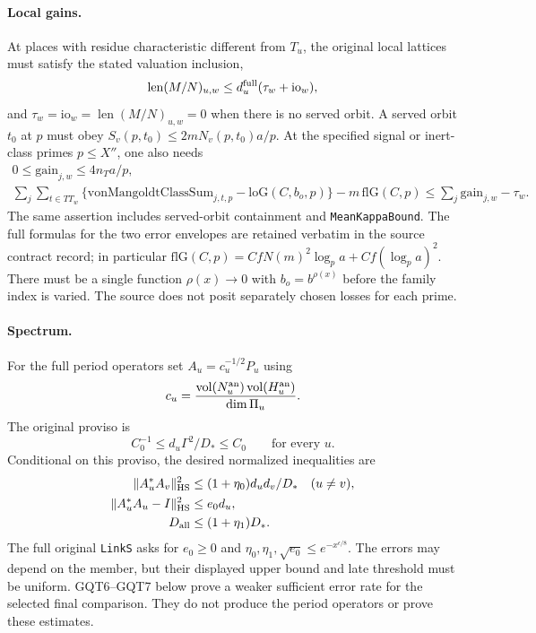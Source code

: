 \paragraph{Local gains.}
At places with residue characteristic different from $T_u$, the
original local lattices must satisfy the stated valuation inclusion,
\[
 \operatorname{len}(M/N)_{u,w}\le d_u^{\rm full}
                                      (\tau_w+\mathrm{io}_w),
\]
and $\tau_w=\mathrm{io}_w=\operatorname{len}(M/N)_{u,w}=0$
when there is no served orbit. A served orbit $t_0$ at $p$ must obey
$S_v(p,t_0)\le2mN_v(p,t_0)a/p$. At the specified signal or
inert-class primes $p\le X''$, one also needs
\begin{gather}
       0\le\mathrm{gain}_{j,w}\le4n_Ta/p,                 \label{eq:gqt-gain1}\\
 \sum_j\sum_{t\in TT_w}
  \{\mathrm{vonMangoldtClassSum}_{j,t,p}-\mathrm{loG}(C,b_o,p)\}
       -m\,\mathrm{flG}(C,p)
   \le\sum_j\mathrm{gain}_{j,w}-\tau_w.                 \label{eq:gqt-gain2}
\end{gather}
The same assertion includes served-orbit containment and
\texttt{MeanKappaBound}. The full formulas for the two error
envelopes are retained verbatim in the source contract record;
in particular $\mathrm{flG}(C,p)=CfN(m)^2\log_p a+
Cf(\log_p a)^2$. There must be a single function $\rho(x)\to0$
with $b_o=b^{\rho(x)}$ before the family index is varied.
The source does not posit separately chosen losses for each prime.

\paragraph{Spectrum.}
For the full period operators set $A_u=c_u^{-1/2}P_u$ using
\[
 c_u=\frac{\operatorname{vol}(N_u^{\rm an})
                 \operatorname{vol}(H_u^{\rm an})}{\dim\Pi_u}.
\]
The original proviso is
\begin{equation}\label{eq:gqt-proviso}
 C_0^{-1}\le d_u\Gamma^2/D_*\le C_0\qquad\text{for every }u.
\end{equation}
Conditional on this proviso, the desired normalized inequalities are
\begin{align}
 \|A_u^*A_v\|_{\mathrm{HS}}^2
     &\le(1+\eta_0)d_ud_v/D_*\quad(u\ne v),             \label{eq:gqt-off}\\
 \|A_u^*A_u-I\|_{\mathrm{HS}}^2&\le e_0d_u,            \label{eq:gqt-diag}\\
 D_{\rm all}&\le(1+\eta_1)D_*.                         \label{eq:gqt-dimension}
\end{align}
The full original \texttt{LinkS} asks for $e_0\ge0$ and
$\eta_0,\eta_1,\sqrt{e_0}\le e^{-x^{\epsilon/8}}$.
The errors may depend on the member, but their displayed upper bound
and late threshold must be uniform. GQT6--GQT7 below prove a weaker
sufficient error rate for the selected final comparison. They do not
produce the period operators or prove these estimates.

